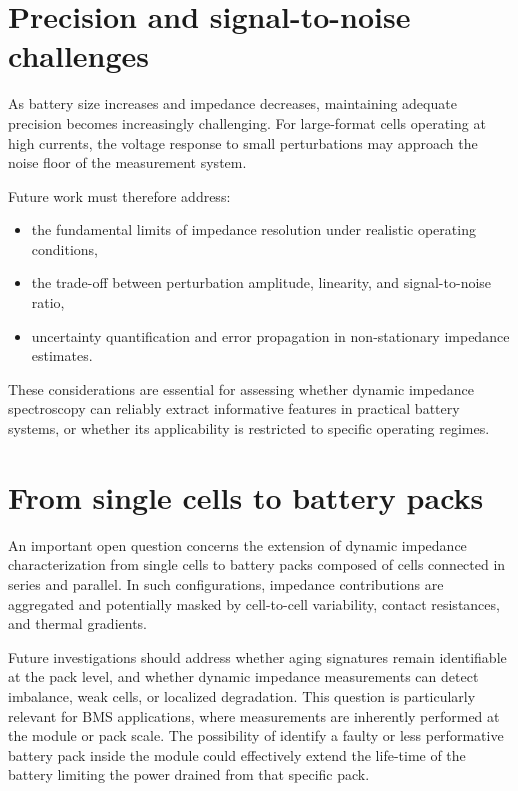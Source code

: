 \section{Precision and signal-to-noise challenges}

As battery size increases and impedance decreases, maintaining adequate precision becomes increasingly challenging. For large-format cells operating at high currents, the voltage response to small perturbations may approach the noise floor of the measurement system.

Future work must therefore address:
\begin{itemize}
    \item the fundamental limits of impedance resolution under realistic operating conditions,
    \item the trade-off between perturbation amplitude, linearity, and signal-to-noise ratio,
    \item uncertainty quantification and error propagation in non-stationary impedance estimates.
\end{itemize}

These considerations are essential for assessing whether dynamic impedance spectroscopy can reliably extract informative features in practical battery systems, or whether its applicability is restricted to specific operating regimes.

\section{From single cells to battery packs}

An important open question concerns the extension of dynamic impedance characterization from single cells to battery packs composed of cells connected in series and parallel. In such configurations, impedance contributions are aggregated and potentially masked by cell-to-cell variability, contact resistances, and thermal gradients.

Future investigations should address whether aging signatures remain identifiable at the pack level, and whether dynamic impedance measurements can detect imbalance, weak cells, or localized degradation. This question is particularly relevant for BMS applications, where measurements are inherently performed at the module or pack scale.
The possibility of identify a faulty or less performative battery pack inside the module could effectively extend the life-time of the battery limiting the power drained from that specific pack.


